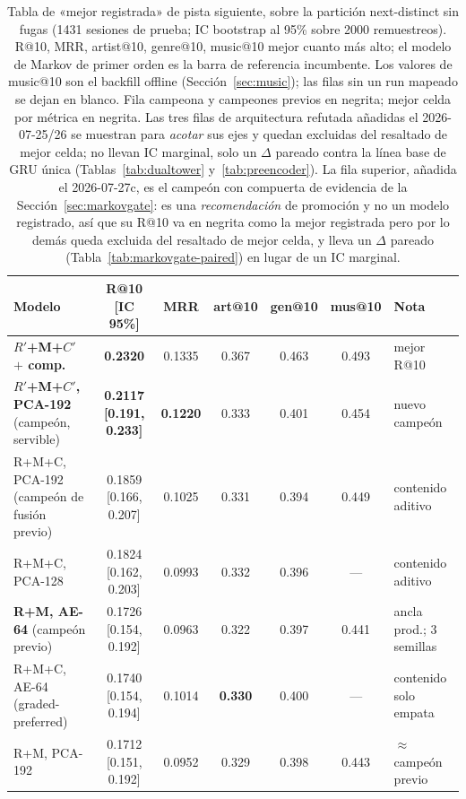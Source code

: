 \documentclass[11pt]{article}
\newcommand{\best}[1]{\textbf{#1}}
\newcommand{\Rp}{\ensuremath{R'}}
\newcommand{\Cp}{\ensuremath{C'}}
\begin{document}
\begin{table}[ht]
  \centering
  \caption{Tabla de «mejor registrada» de pista siguiente, sobre la partición
  next-distinct sin fugas (\num{1431} sesiones de prueba; IC bootstrap al 95\%
  sobre \num{2000} remuestreos). R@10, MRR, artist@10, genre@10, music@10 mejor cuanto más
  alto; el modelo de Markov de primer orden es la barra de referencia incumbente.
  Los valores de music@10 son el backfill offline (Sección~\ref{sec:music}); las
  filas sin un run mapeado se dejan en blanco. Fila campeona y campeones previos en
  negrita; mejor celda por métrica en negrita. Las tres filas de arquitectura
  refutada añadidas el 2026-07-25/26 se muestran para \emph{acotar} sus ejes y
  quedan excluidas del resaltado de mejor celda; no llevan IC marginal, solo un
  $\Delta$ pareado contra la línea base de GRU única (Tablas~\ref{tab:dualtower}
  y~\ref{tab:preencoder}). La fila superior, añadida el 2026-07-27c, es el campeón
  con compuerta de evidencia de la Sección~\ref{sec:markovgate}: es una
  \emph{recomendación} de promoción y no un modelo registrado, así que su R@10 va en
  negrita como la mejor registrada pero por lo demás queda excluida del resaltado de
  mejor celda, y lleva un $\Delta$ pareado (Tabla~\ref{tab:markovgate-paired}) en
  lugar de un IC marginal.}
  \label{tab:lb}
  {\footnotesize\setlength{\tabcolsep}{3.2pt}\begin{tabular}{lcccccl}
    \toprule
    Modelo & R@10 [IC 95\%] & MRR & art@10 & gen@10 & mus@10 & Nota \\
    \midrule
    \best{\Rp+M+\Cp\ $+$ comp.} & \best{0.2320} & 0.1335 & 0.367 & 0.463 & 0.493 & mejor R@10 \\
    \best{\Rp+M+\Cp, PCA-192} (campeón, servible) & \best{0.2117 [0.191, 0.233]} & \best{0.1220} & 0.333 & 0.401 & 0.454 & nuevo campeón \\
    R+M+C, PCA-192 (campeón de fusión previo) & 0.1859 [0.166, 0.207] & 0.1025 & 0.331 & 0.394 & 0.449 & contenido aditivo \\
    R+M+C, PCA-128                        & 0.1824 [0.162, 0.203] & 0.0993 & 0.332 & 0.396 & --- & contenido aditivo \\
    \best{R+M, AE-64} (campeón previo)    & 0.1726 [0.154, 0.192] & 0.0963 & 0.322 & 0.397 & 0.441 & ancla prod.; 3 semillas \\
    R+M+C, AE-64 (graded-preferred)       & 0.1740 [0.154, 0.194] & 0.1014 & \best{0.330} & 0.400 & --- & contenido solo empata \\
    R+M, PCA-192                          & 0.1712 [0.151, 0.192] & 0.0952 & 0.329 & 0.398 & 0.443 & $\approx$ campeón previo \\

\end{tabular}}
\end{table}
\end{document}
